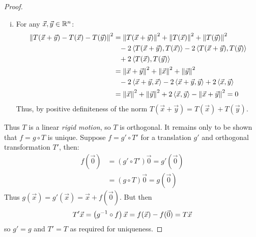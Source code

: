 \begin{proof}
\begin{enumerate}[i.]
    \item For any $\vec x, \vec y \in \mathbb{R}^n$:
      \begin{align}
        \left\lVert T(\vec x + \vec y) - T(\vec x) - T(\vec y)\right\rVert^2
          &= \left\lVert T(\vec x + \vec y)\right\rVert^2 + \left\lVert T(\vec x)\right\rVert^2 + \left\lVert T(\vec y)\right\rVert^2 \\
          &\phantom{=} - 2\left\langle T(\vec x + \vec y) , T(\vec x) \right\rangle - 2\left\langle T(\vec x + \vec y) , T(\vec y) \right\rangle \notag \\
          &\phantom{=} + 2\left\langle T(\vec x) , T(\vec y) \right\rangle \notag \\
          &= \left\lVert\vec x + \vec y\right\rVert^2 + \left\lVert\vec x\right\rVert^2 + \left\lVert\vec y\right\rVert^2 \\
          &\phantom{=} -2\left\langle \vec x + \vec y , \vec x \right\rangle - 2\left\langle \vec x + \vec y , \vec y \right\rangle + 2\left\langle \vec x , \vec y \right\rangle \notag \\
          &= \left\lVert\vec x\right\rVert^2 + \left\lVert\vec y\right\rVert^2 + 2\left\langle \vec x , \vec y \right\rangle -\left\lVert\vec x + \vec y\right\rVert^2 = 0
      \end{align}
      Thus, by positive definiteness of the norm $T(\vec x + \vec y) = T(\vec x) + T(\vec y)$.
  \end{enumerate}
  Thus $T$ is a linear \emph{rigid motion}, so $T$ is orthogonal. It remains only to be shown that $f = g \circ T$ is unique.
  Suppose $f = g' \circ T'$ for a translation $g'$ and orthogonal transformation $T'$, then:
    \begin{align}
      f(\vec 0) &= (g' \circ T') \vec 0 = g'(\vec 0) \\
                &= (g \circ T) \vec 0 = g(\vec 0)
    \end{align}
  Thus $g(\vec x) = g'(\vec x) = \vec x + f(\vec 0)$. But then
    $$T'\vec x = \left(g^{-1} \circ f\right)\vec x = f(\vec x) - f(\vec 0) = T\vec x$$
  so $g' = g$ and $T' = T$ as required for uniqueness.
\end{proof}
